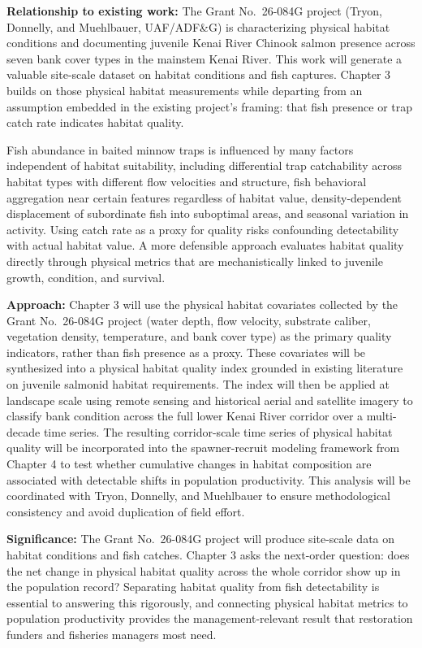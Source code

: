 \documentclass[
  letterpaper,
  DIV=11,
  numbers=noendperiod]{scrreprt}
\begin{document}
\textbf{Relationship to existing work:} The Grant No.~26-084G project
(Tryon, Donnelly, and Muehlbauer, UAF/ADF\&G) is characterizing physical
habitat conditions and documenting juvenile Kenai River Chinook salmon
presence across seven bank cover types in the mainstem Kenai River. This
work will generate a valuable site-scale dataset on habitat conditions
and fish captures. Chapter 3 builds on those physical habitat
measurements while departing from an assumption embedded in the existing
project's framing: that fish presence or trap catch rate indicates
habitat quality.

Fish abundance in baited minnow traps is influenced by many factors
independent of habitat suitability, including differential trap
catchability across habitat types with different flow velocities and
structure, fish behavioral aggregation near certain features regardless
of habitat value, density-dependent displacement of subordinate fish
into suboptimal areas, and seasonal variation in activity. Using catch
rate as a proxy for quality risks confounding detectability with actual
habitat value. A more defensible approach evaluates habitat quality
directly through physical metrics that are mechanistically linked to
juvenile growth, condition, and survival.

\textbf{Approach:} Chapter 3 will use the physical habitat covariates
collected by the Grant No.~26-084G project (water depth, flow velocity,
substrate caliber, vegetation density, temperature, and bank cover type)
as the primary quality indicators, rather than fish presence as a proxy.
These covariates will be synthesized into a physical habitat quality
index grounded in existing literature on juvenile salmonid habitat
requirements. The index will then be applied at landscape scale using
remote sensing and historical aerial and satellite imagery to classify
bank condition across the full lower Kenai River corridor over a
multi-decade time series. The resulting corridor-scale time series of
physical habitat quality will be incorporated into the spawner-recruit
modeling framework from Chapter 4 to test whether cumulative changes in
habitat composition are associated with detectable shifts in population
productivity. This analysis will be coordinated with Tryon, Donnelly,
and Muehlbauer to ensure methodological consistency and avoid
duplication of field effort.

\textbf{Significance:} The Grant No.~26-084G project will produce
site-scale data on habitat conditions and fish catches. Chapter 3 asks
the next-order question: does the net change in physical habitat quality
across the whole corridor show up in the population record? Separating
habitat quality from fish detectability is essential to answering this
rigorously, and connecting physical habitat metrics to population
productivity provides the management-relevant result that restoration
funders and fisheries managers most need.
\end{document}

